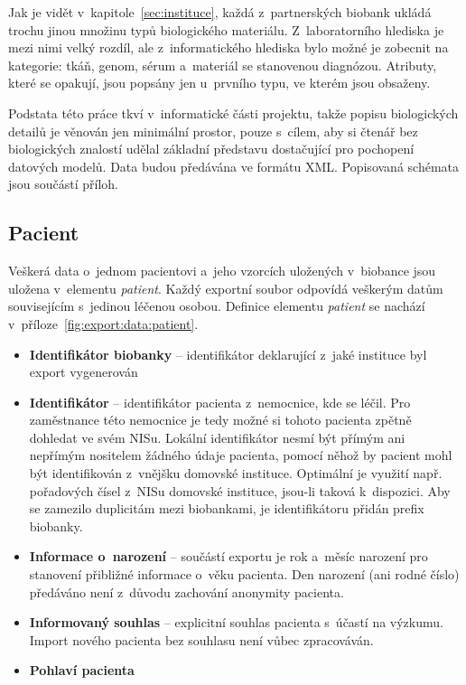 \documentclass[11pt, draft, oneside]{fithesis2}
\newcommand{\polozka}[1]{\item {\bf #1}\xspace}
\begin{document}
Jak je vidět v~kapitole~\ref{sec:instituce}, každá z~partnerských biobank ukládá trochu jinou množinu typů biologického materiálu. Z~laboratorního hlediska je mezi nimi velký rozdíl, ale z~informatického hlediska bylo možné je zobecnit na kategorie: tkáň, genom, sérum a~materiál se stanovenou diagnózou. Atributy, které se opakují, jsou popsány jen u~prvního typu, ve kterém jsou obsaženy.

Podstata této práce tkví v~informatické části projektu, takže popisu biologických detailů je věnován jen minimální prostor, pouze s~cílem, aby si čtenář bez biologických znalostí udělal základní představu dostačující pro pochopení datových modelů.
Data budou předávána ve formátu XML. Popisovaná schémata jsou součástí příloh.

\subsection{Pacient}
Veškerá data o~jednom pacientovi a~jeho vzorcích uložených v~biobance jsou uložena v~elementu \textit{patient}. Každý exportní soubor odpovídá veškerým datům souvisejícím s~jedinou léčenou osobou. Definice elementu \textit{patient} se nachází v~příloze~\ref{fig:export:data:patient}.

\begin{itemize}
		\polozka{Identifikátor biobanky} -- identifikátor deklarující z~jaké instituce byl export vygenerován

		\polozka{Identifikátor} -- identifikátor pacienta z~nemocnice, kde se léčil. Pro zaměstnance této nemocnice je tedy možné si tohoto pacienta zpětně dohledat ve svém NISu. Lokální identifikátor nesmí být přímým ani nepřímým nositelem žádného údaje pacienta, pomocí něhož by pacient mohl být identifikován z~vnějšku domovské instituce. Optimální je využití např. pořadových čísel z~NISu domovské instituce, jsou-li taková k~dispozici. Aby se zamezilo duplicitám mezi biobankami, je identifikátoru přidán prefix biobanky.
		
		\polozka{Informace o~narození} -- součástí exportu je rok a~měsíc narození pro stanovení přibližné informace o~věku pacienta. Den narození (ani rodné číslo) předáváno není z~důvodu zachování anonymity pacienta.
		
		\polozka{Informovaný souhlas} -- explicitní souhlas pacienta s~účastí na výzkumu. Import nového pacienta bez souhlasu není vůbec zpracováván.
			
		\polozka{Pohlaví pacienta}
		
	\end{itemize}
\end{document}
